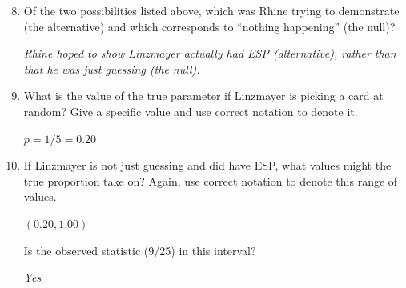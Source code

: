  \begin{enumerate}
   \setcounter{enumi}{7}
   \item   Of the two possibilities listed above, which was Rhine
     trying to demonstrate (the alternative) and which corresponds to
     ``nothing happening'' (the null)? 
\begin{students}
  \vspace{1cm}
\end{students}

\begin{key}
{\it Rhine hoped to show Linzmayer actually had ESP (alternative),
  rather than that he was just guessing (the null).}
\end{key}

\item\label{trueESP-p} What is the value of the true parameter if
  Linzmayer is picking a card at random? Give a specific value and use
  correct notation to denote it. 
\begin{students}
  \vspace{1cm}
\end{students}

\begin{key}
$p = 1/5 = 0.20$
\end{key}


   \item If Linzmayer is not just guessing and did have ESP, what
     values might the true proportion take on?  Again, use correct notation to
     denote this range of values. 
\begin{students}
  \vspace{1cm}
\end{students}

\begin{key}
$(0.20, 1.00)$
\end{key}
     Is the observed statistic (9/25) in this interval?
\begin{students}
  \vspace{0.4cm}
\end{students}

\begin{key}
{\it Yes}
\end{key}



\end{enumerate}
